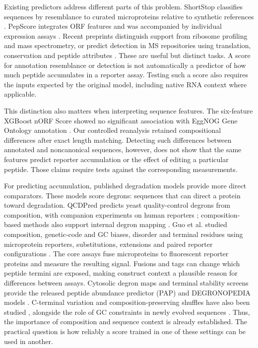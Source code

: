 \documentclass[11pt,a4paper]{article}
\begin{document}
Existing predictors address different parts of this problem. ShortStop
classifies sequences by resemblance to curated microproteins relative to
synthetic references \cite{shortstop}. PepScore integrates ORF features and
was accompanied by individual expression assays \cite{yang}. Recent
preprints distinguish support from ribosome profiling and mass spectrometry,
or predict detection in MS repositories using translation, conservation and
peptide attributes \cite{trans2ms,fierro}. These are useful but distinct
tasks. A score for annotation resemblance or detection is not automatically
a predictor of how much peptide accumulates in a reporter assay. Testing
such a score also requires the inputs expected by the original model,
including native RNA context where applicable.

This distinction also matters when interpreting sequence features. The
six-feature XGBoost nORF Score showed no significant association with EggNOG
Gene Ontology annotation \cite{gounder}. Our controlled reanalysis retained
compositional differences after exact length matching. Detecting such
differences between annotated and noncanonical sequences, however, does not
show that the same features predict reporter accumulation or the effect of
editing a particular peptide. Those claims require tests against the
corresponding measurements.

For predicting accumulation, published degradation models provide more
direct comparators. These models score degrons: sequences that can direct
a protein toward degradation. QCDPred predicts yeast quality-control degrons from
composition, with companion experiments on human reporters
\cite{qcdpred,mashahreh}; composition-based methods also support internal
degron mapping \cite{zhanginternal}. Guo et al. studied composition,
genetic-code and GC biases, disorder and terminal residues using
microprotein reporters, substitutions, extensions and paired reporter
configurations \cite{guo}. The core assays fuse microproteins to fluorescent
reporter proteins and measure the resulting signal. Fusions and tags can
change which peptide termini are exposed, making construct context a
plausible reason for differences between assays. Cytosolic degron maps and
terminal stability screens provide the released peptide abundance predictor
(PAP) and DEGRONOPEDIA models
\cite{voutsinos,degronopedia,koren,timms}. C-terminal variation and
composition-preserving shuffles have also been studied \cite{chu,casola},
alongside the role of GC constraints in newly evolved sequences
\cite{roginski}. Thus, the importance of composition and sequence context
is already established. The practical question is how reliably a score
trained in one of these settings can be used in another.
\end{document}
